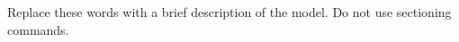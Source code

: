 %
%
%
%

Replace these words with a brief description of the model. Do not use
sectioning commands.
